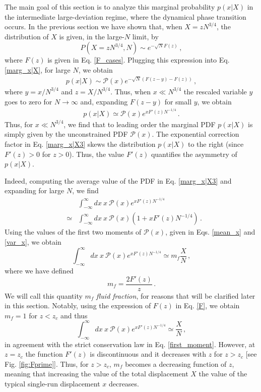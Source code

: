\documentclass[aps,pre,twocolumn,superscriptaddress,showpacs]{revtex4-1}
\newcommand{\bea}{\begin{eqnarray}}
\newcommand{\eea}{\end{eqnarray}}
\newcommand{\mP}{\mathcal{P}}
\begin{document}
The main goal of this section is to analyze this marginal probability $p(x|X)$ in the intermediate large-deviation regime, where the dynamical phase transition occurs. In the previous section we have shown that, when $X=z N^{3/4}$, the distribution of $X$ is given, in the large-$N$ limit, by
\begin{equation}
P(X=z N^{3/4},N)\sim e^{-\sqrt{N}F(z)}\,,
\end{equation}
where $F(z)$ is given in Eq. \eqref{F_cases}. Plugging this expression into Eq. \eqref{marg_x|X}, for large $N$, we obtain 
\bea
p(x|X)\sim \mP(x)e^{-\sqrt{N}(F(z-y)-F(z))}\,,
\label{marg_x|X2}
\eea
where $y=x/ N^{3/4}$ and $z=X/N^{3/4}$. Thus, when $x\ll N^{3/4}$ the rescaled variable $y$ goes to zero for $N\to \infty$ and, expanding $F(z-y)$ for small $y$, we obtain
\bea
p(x|X)\simeq \mP(x) e^{x F'(z) N^{-1/4}}\,.
\label{marg_x|X3}
\eea
Thus, for $x\ll N^{3/4}$, we find that to leading order the marginal PDF $p(x|X)$ is simply given by the unconstrained PDF $\mP(x)$. The exponential correction factor in Eq. \eqref{marg_x|X3} skews the distribution $p(x|X)$ to the right (since $F'(z)>0$ for $z>0$). Thus, the value $F'(z)$ quantifies the asymmetry of $p(x|X)$.


Indeed, computing the average value of the PDF in Eq. \eqref{marg_x|X3} and expanding for large $N$, we find
\begin{eqnarray}
&& \int_{-\infty}^{\infty}dx~x~\mP(x) e^{x F'(z) N^{-1/4}}\\
& \simeq & \int_{-\infty}^{\infty}dx~x~\mP(x) \left(1+xF'(z)N^{-1/4}\right)\,.\nonumber
\end{eqnarray}
Using the values of the first two moments of $\mP(x)$, given in Eqs. \eqref{mean_x} and \eqref{var_x}, we obtain
\begin{equation}
 \int_{-\infty}^{\infty}dx~x~\mP(x) e^{x F'(z) N^{-1/4}}\simeq m_f\frac{X}{N}\,,
 \label{avg_bulk}
\end{equation}
where we have defined 
\begin{equation}
m_f=\frac{2F'(z)}{z}\,.
\label{mf}
\end{equation}
We will call this quantity $m_f$ \emph{fluid fraction}, for reasons that will be clarified later in this section. Notably, using the expression of $F(z)$ in Eq. \eqref{F}, we obtain $m_f=1$ for $z<z_c$  and thus
\begin{equation}
 \int_{-\infty}^{\infty}dx~x~\mP(x) e^{x F'(z) N^{-1/4}}\simeq\frac{X}{N}\,,
\end{equation}
in agreement with the strict conservation law in Eq. \eqref{first_moment}. However, at $z=z_c$ the function $F'(z)$ is discontinuous and it decreases with $z$ for $z>z_c$ [see Fig. \eqref{fig:Fprime}]. Thus, for $z>z_c$, $m_f$ becomes a decreasing function of $z$, meaning that increasing the value of the total displacement $X$ the value of the typical single-run displacement $x$ decreases. 
\end{document}

